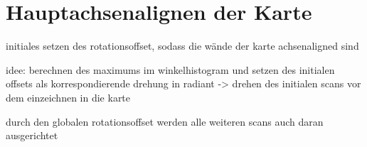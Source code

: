 \section{Hauptachsenalignen der Karte}

initiales setzen des rotationsoffset, sodass die wände der karte achsenaligned sind

idee: berechnen des maximums im winkelhistogram und setzen des initialen offsets als korrespondierende drehung in radiant -> drehen des initialen scans vor dem einzeichnen in die karte

durch den globalen rotationsoffset werden alle weiteren scans auch daran ausgerichtet